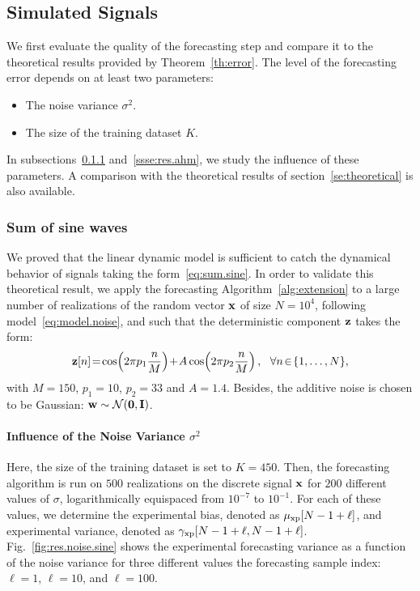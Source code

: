 \subsection{Simulated Signals}
We first evaluate the quality of the forecasting step and compare it to the theoretical results provided by Theorem~\ref{th:error}. The level of the forecasting error depends on at least two parameters:
\begin{itemize}
\item The noise variance $\sigma^2$.
\item The size of the training dataset $K$. 
\end{itemize}
In subsections~\ref{ssse:res.sine} and~\ref{ssse:res.ahm}, we study the influence of these parameters. A comparison with the theoretical results of section~\ref{se:theoretical} is also available.

\subsubsection{Sum of sine waves}
\label{ssse:res.sine}
We proved that the linear dynamic model is sufficient to catch the dynamical behavior of signals taking the form~\eqref{eq:sum.sine}. In order to validate this theoretical result, we apply the forecasting Algorithm~\ref{alg:extension} to a large number of realizations of the random vector ${\mathbf x}$ of size $N=10^4$, following model~\eqref{eq:model.noise}, and such that the deterministic component ${\mathbf z}$ takes the form:
\[
\bz[n]\! =\!\cos\!\left(2\pi p_1 \dfrac{n}{M} \right)\! +\! A\cos\!\left(2\pi p_2 \dfrac{n}{M} \right),\quad \!\!\forall n\!\in\!\{1,\ldots,N\},
\]
with $M=150$, $p_1=10$, $p_2=33$ and $A=1.4$. Besides, the additive noise is chosen to be Gaussian: ${\mathbf w}\sim{\mathcal N}(\boldsymbol{0},{\mathbf I})$.


\paragraph{Influence of the Noise Variance $\sigma^2$} Here, the size of the training dataset is set to $K=450$. Then, the forecasting algorithm is run on $500$ realizations on the discrete signal ${\mathbf x}$ for $200$ different values of $\sigma$, logarithmically equispaced from $10^{-7}$ to $10^{-1}$. For each of these values, we determine the experimental bias, denoted as $\mu_{{\mathrm{xp}}}[N-1+\ell]$, and experimental variance, denoted as $\gamma_{{\mathrm{xp}}}[N-1+\ell,N-1+\ell]$. Fig.~\ref{fig:res.noise.sine} shows the experimental forecasting variance as a function of the noise variance for three different values the forecasting sample index: $\ell=1$, $\ell=10$, and $\ell=100$.

